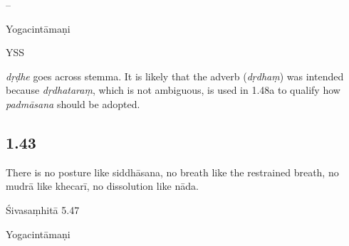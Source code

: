 \begin{ekdosis}
\begin{sources}[hp01_042]
--
\end{sources}

\begin{testimonia}[hp01_042]
Yogacintāmaṇi

\begin{versinnote}
\end{versinnote}

YSS

\begin{versinnote}
\end{versinnote}

\end{testimonia}

\begin{philcomm}[hp01_042]
\emph{dṛḍhe} goes across stemma. It is likely that the adverb (\emph{dṛdhaṃ}) was intended because \emph{dṛdhataraṃ}, which is not ambiguous, is used in 1.48a to qualify how \emph{padmāsana} should be adopted.
\end{philcomm}

\subsection*{1.43}
\begin{translation}[hp01_043]
There is no posture like siddhāsana, no breath like the restrained breath, no mudrā like khecarī, no dissolution like nāda.
\end{translation}

\begin{sources}[hp01_043]
Śivasaṃhitā 5.47

\begin{versinnote}
\end{versinnote}

\end{sources}

\begin{testimonia}[hp01_043]
Yogacintāmaṇi


\end{testimonia}
\end{ekdosis}

